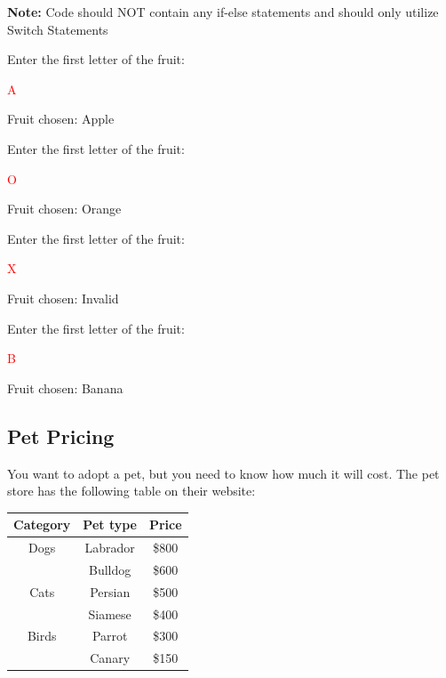 \textbf{Note:} Code should NOT contain any  if-else statements and should only utilize Switch Statements


\begin{sample}
Enter the first letter of the fruit:

 \textcolor{red}{A}
 
Fruit chosen: Apple


\end{sample}

\begin{sample}
Enter the first letter of the fruit:

 \textcolor{red}{O}
 
Fruit chosen: Orange


\end{sample}

\begin{sample}
Enter the first letter of the fruit:

 \textcolor{red}{X}
 
Fruit chosen: Invalid

\end{sample}

\begin{sample}
Enter the first letter of the fruit:

 \textcolor{red}{B}
 
Fruit chosen: Banana

\end{sample}

\subsection{Pet Pricing}

You want to adopt a pet, but you need to know how much it will cost. The pet store has the following table on their website:


\begin{table}[H]
    \centering
       \begin{tabular}{|c|c|c|}
    \hline
    \textbf{Category} & \textbf{Pet type} & \textbf{Price} \\
    \hline
    Dogs & Labrador & \$800 \\
                           & Bulldog & \$600 \\
    \hline
    Cats & Persian & \$500 \\
                              & Siamese & \$400 \\
    \hline
    Birds & Parrot & \$300 \\
                                & Canary & \$150 \\
    \hline
    \end{tabular}

\end{table}


